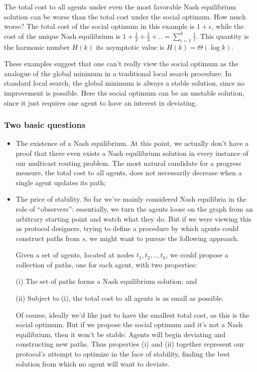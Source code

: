 The total cost to all agents under even the most favorable Nash equilibrium solution can be worse than the total cost under the social optimum. How much worse? The total cost of the social optimum in this example is $1+\epsilon$, while the cost of the unique Nash equilibrium is $1 + \frac{1}{2} + \frac{1}{3} + .. = \sum \limits_{i = 1}^k \frac{1}{i}$. This quantity is the harmonic number $H(k)$ its asymptotic value is $H(k) = \Theta(\log k)$. 

These examples suggest that one can’t really view the social optimum as the analogue of the global minimum in a traditional local search procedure. In standard local search, the global minimum is always a stable solution, since no improvement is possible. Here the social optimum can be an unstable solution, since it just requires one agent to have an interest in deviating.

\subsubsection{Two basic questions}
\begin{itemize}
    \item The existence of a Nash equilibrium. At this point, we actually don’t have a proof that there even exists a Nash equilibrium solution in every instance of our multicast routing problem. The most natural candidate for a progress measure, the total cost to all agents, does not necessarily decrease when a single agent updates its path;
    \item The price of stability. So far we’ve mainly considered Nash equilibria in the role of “observers”: essentially, we turn the agents loose on the graph from an arbitrary starting point and watch what they do. But if we were viewing this as protocol designers, trying to define a procedure by which agents could construct paths from $s$, we might want to pursue the following approach. 
    
    Given a set of agents, located at nodes $t_1, t_2,.., t_k$, we could propose a collection of paths, one for each agent, with two properties:
    
    (i) The set of paths forms a Nash equilibrium solution; and
    
    (ii) Subject to (i), the total cost to all agents is as small as possible.

    Of course, ideally we’d like just to have the smallest total cost, as this is the social optimum. But if we propose the social optimum and it’s not a Nash equilibrium, then it won’t be stable: Agents will begin deviating and constructing new paths. Thus properties (i) and (ii) together represent our protocol’s attempt to optimize in the face of stability, finding the best solution from which no agent will want to deviate.

\end{itemize}

